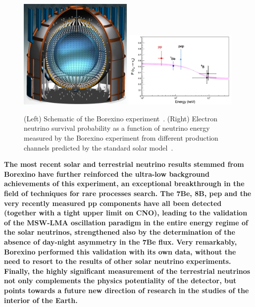 \begin{figure}[h!]
\centering
  \centering
\includegraphics[width=0.49\textwidth]{figures/borexino.jpeg}
\includegraphics[width=0.49\textwidth]{figures/borexino3.jpeg}
\vspace{2mm}
\caption{(Left) Schematic of the Borexino experiment~\cite{63Borexino}. (Right) Electron neutrino survival probability as a function of neutrino energy measured by the Borexino experiment from different production channels predicted by the standard solar model~\cite{63Borexino}.}
\label{fig:borexino}
\end{figure}

\textbf{The most recent solar and terrestrial neutrino results stemmed from Borexino have further reinforced the ultra-low background achievements of this experiment, an exceptional breakthrough in the field of techniques for rare processes search. The 7Be, 8B, pep and the very recently measured pp components have all been detected (together with a tight upper limit on CNO), leading to the validation of the MSW-LMA oscillation paradigm in the entire energy regime of the solar neutrinos, strengthened also by the determination of the absence of day-night asymmetry in the 7Be flux. Very remarkably, Borexino performed this validation with its own data, without the need to resort to the results of other solar neutrino experiments.
Finally, the highly significant measurement of the terrestrial neutrinos not only complements the physics potentiality of the detector, but points towards a future new direction of research in the studies of the interior of the Earth.}
\fi

